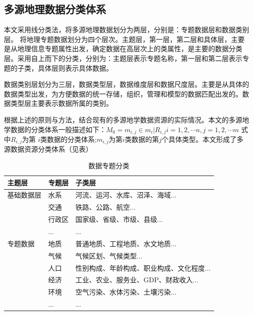\documentclass[master]{njnuthesis}
\begin{document}
\subsection{多源地理数据分类体系}
本文采用线分类法，将多源地理数据划分为两层，分别是：专题数据层和数据类别层。
将地理专题数据划分为四个层次。主题层，第一层，第二层和具体层，主要是从地理信息专题属性出发，确定数据在高层次上的类属性，是主要的数据分类层。采用自上而下的分类，分别为：主题层表示专题名称，第一层和第二层表示专题的子类，具体层则表示具体数据。

数据类别层划分为三层，数据类型层，数据维度层和数据尺度层。主要是从具体的数据类型出发，为方便数据的统一存储，组织，管理和模型的数据匹配出发的。数据类型层主要表示数据所属的类别。

根据上述的原则与方法，结合现有的多源地学数据资源的实际情况。本文的多源地学数据的分类体系一般描述如下：$M_0 = {m_{i,j} \in m_i | R _{i,j}} i = 1,2,\cdots n, j = 1,2,\cdots m$ 式中$R_{i,j}$为第 $i$类数据的分类体系;$m_{i,j}$为第$i$类数据的第$j$个具体类型。本文形成了多源数据资源分类体系（见表）

\begin{table}[t]
\caption{数据专题分类}\label{tab:table2.1}
\begin{center}
\begin{tabular}{@{}lll@{}}
\toprule
主题层   & 专题层 & 子类层                    \\ \midrule
基础数据层 & 水系  & 河流、运河、水库、沼泽、海域...      \\
      & 交通  & 铁路、公路、航空...            \\
      & 行政区 & 国家级、省级、市级、县级...        \\
      & ...    & ...                       \\
专题数据  & 地质  & 普通地质、工程地质、水文地质...      \\
      & 气候  & 气候区划、气候类型...           \\
      & 人口  & 性别构成、年龄构成、职业构成、文化程度... \\
      & 经济  & 工业、农业、服务业、GDP、财政收入...  \\
      & 环境  & 空气污染、水体污染、土壤污染...      \\
      & ...    &  ...                      \\ \bottomrule
\end{tabular}
\end{center}
\end{table}
\end{document}
